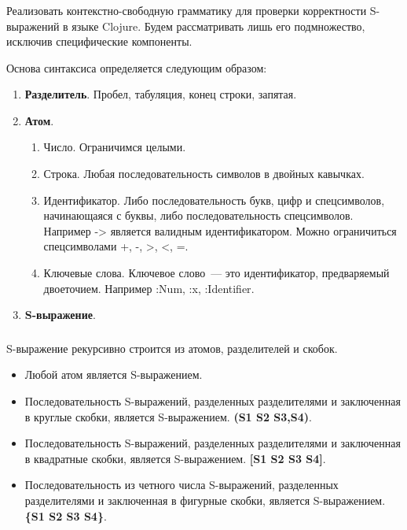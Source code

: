 \begin{frame}

\frametitle{\insertsection}

	Реализовать контекстно-свободную грамматику для проверки корректности S-выражений в языке Clojure.
	Будем рассматривать лишь его подмножество, исключив специфические компоненты.
	
	Основа синтаксиса определяется следующим образом:
	
	\begin{enumerate}
		\item \textbf{Разделитель}. Пробел, табуляция, конец строки, запятая.
		\item \textbf{Атом}.
		\begin{enumerate}
			\item Число. Ограничимся целыми.
			\item Строка. Любая последовательность символов в двойных кавычках.
			\item Идентификатор. Либо последовательность букв, цифр и спецсимволов, начинающаяся с буквы, либо последовательность спецсимволов. Например
			\alert{-\textgreater} является валидным идентификатором. Можно ограничиться спецсимволами \alert{+, -, \textgreater, <, =}.
			\item Ключевые слова. Ключевое слово~--- это идентификатор, предваряемый двоеточием. Например \alert{:Num, :x, :Identifier}.
		\end{enumerate}
		\item \textbf{S-выражение}.
	\end{enumerate}

\end{frame}


\begin{frame}

\frametitle{\insertsection}

	S-выражение рекурсивно строится из атомов, разделителей и скобок.
	
	\begin{itemize}
		\item Любой атом является S-выражением.
		\item Последовательность S-выражений, разделенных разделителями и заключенная в круглые скобки, является S-выражением.
		\textbf{(S1 S2 S3,S4)}.
		\item Последовательность S-выражений, разделенных разделителями и заключенная в квадратные скобки, является S-выражением.
		\textbf{[S1 S2 S3 S4]}.
		\item Последовательность из четного числа S-выражений, разделенных разделителями и заключенная в фигурные скобки, является S-выражением.
		\textbf{\{S1 S2 S3 S4\}}.
	\end{itemize}

\end{frame}


